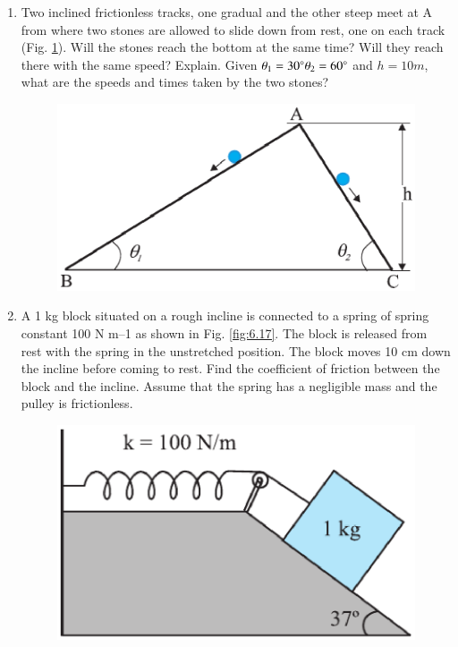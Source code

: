 \begin{enumerate}[label=\arabic*.,ref=\thesubsection.\theenumi]
\item Two inclined frictionless tracks, one gradual and the other steep meet at A from where two stones are allowed to slide down from rest, one on each track (Fig. \ref{fig:6.16}). Will the stones reach the bottom at the same time? Will they reach there with the same speed? Explain. Given $\theta_1 = 30\degree\theta_2 = 60\degree$  and $h = 10m$, what are the speeds and times taken by the two stones?
\begin{figure}[!ht]
\includegraphics[width=\columnwidth]{./figs/11-1/6/6.16.eps}
\caption{}
\label{fig:6.16}
\end{figure}
\item  A 1 kg block situated on a rough incline is connected to a spring of spring constant 100 N m–1
as shown in Fig. \ref{fig:6.17}. The block is released from rest with the spring in the
unstretched position. The block moves 10 cm down the incline before coming to rest. Find the coefficient of friction between the block and the incline. Assume that the
spring has a negligible mass and the pulley is frictionless.
\begin{figure}[!ht]
\includegraphics[width=\columnwidth]{./figs/11-1/6/6.17.eps}

\end{figure}
\end{enumerate}
